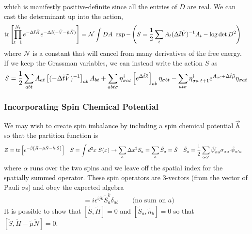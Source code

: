 which is manifestly positive-definite since all the entries of $D$ are real.
We can cast the determinant up into the action,
\begin{align}
	\text{tr}\left[ \prod_{t=1}^{N_t} e^{-\Delta \tilde{t}\tilde{K}}  e^{-\Delta \tilde{t} (-\tilde{V} - \tilde{\mu}\tilde{N})}  \right]
	=&
	~\mathcal{N}
	\int DA ~ \exp -\left(S = \frac{1}{2} \sum_t A_t (\Delta\tilde{t}\tilde{V})^{-1} A_t - \log \det D^2 \right)
\end{align}
where $\mathcal{N}$ is a constant that will cancel from many derivatives of the free energy.
If we keep the Grassman variables, we can instead write the action $S$ as
\begin{align}
	S = 
	\frac{1}{2} \sum_{ab t} A_{at} \left[(-\Delta\tilde{t} \tilde{V})^{-1}\right]_{ab} A_{bt}
+	\sum_{ab t \sigma} \eta{}^{\dagger}_{\sigma a t} \left[ e^{\Delta\tilde{t}\tilde{\kappa}}\right]_{ab} \eta_{\sigma b t}
-	\sum_{a t \sigma}\eta{}^{\dagger}_{\sigma a\; t+1} e^{A_{at} + \Delta \tilde{t} \tilde{\mu}} \eta_{\sigma a t}
\end{align}

\subsubsection{Incorporating Spin Chemical Potential}

We may wish to create spin imbalance by including a spin chemical potential $\vec{h}$ so that the partition function is
\begin{align}
	Z &= \text{tr}\left[e^{-\tilde{\beta}\left(\tilde{H} - \tilde{\mu}\tilde{N} - \tilde{h}\cdot\tilde{S}\right)} \right]
	&
	S &= \int d^2x~ S(x) \rightarrow \sum_a \Delta x^2 S_a = \sum_a \tilde{S}_a = \tilde{S}
	&
	\tilde{S}_a &= \frac{1}{2} \sum_{\alpha \alpha'} \tilde{\psi}{}^{\dagger}_{\alpha a} \sigma_{\alpha \alpha'} \tilde{\psi}_{\alpha' a}
\end{align}
where $\alpha$ runs over the two spins and we leave off the spatial index for the spatially summed operator.
These spin operators are 3-vectors (from the vector of Pauli $\sigma$s) and obey the expected algebra
\begin{align}
	[\tilde{S}_a^i, \tilde{S}_b^j] &= i \epsilon^{ijk} \tilde{S}^k_a \delta_{ab} \qquad\text{(no sum on }a)
\end{align}
It is possible to show that $[\tilde{S}, \tilde{H}] = 0$ and $[\tilde{S}_a, \tilde{n}_b] = 0$ so that $[\tilde{S}, \tilde{H} - \tilde{\mu}\tilde{N}] = 0$.

